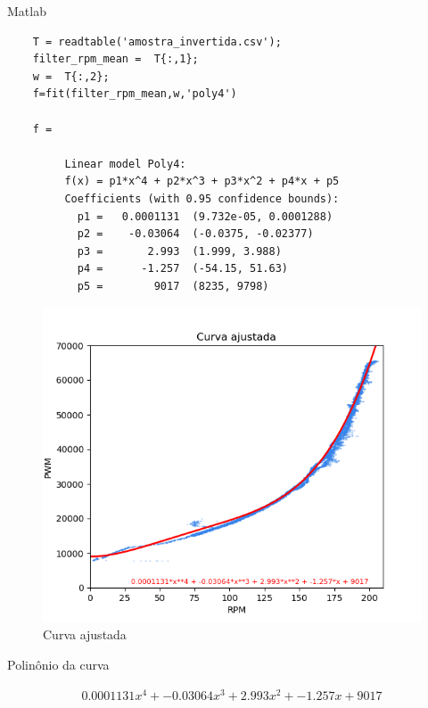 Matlab
\lstset{language=Matlab}
\begin{lstlisting}
    T = readtable('amostra_invertida.csv');
    filter_rpm_mean =  T{:,1};
    w =  T{:,2};
    f=fit(filter_rpm_mean,w,'poly4')

    f = 
    
         Linear model Poly4:
         f(x) = p1*x^4 + p2*x^3 + p3*x^2 + p4*x + p5
         Coefficients (with 0.95 confidence bounds):
           p1 =   0.0001131  (9.732e-05, 0.0001288)
           p2 =    -0.03064  (-0.0375, -0.02377)
           p3 =       2.993  (1.999, 3.988)
           p4 =      -1.257  (-54.15, 51.63)
           p5 =        9017  (8235, 9798)

\end{lstlisting}

\begin{figure}[h]
	\centering
	\includegraphics{figures/curva_ajustada}
	\caption{Curva ajustada}
	\label{fig:curva_ajustada}
\end{figure}


Polinônio da curva

\begin{equation}
    \begin{split}
        0.0001131x^{4} + -0.03064x^{3} + 2.993x^{2} + -1.257x + 9017
    \end{split}
\end{equation}

